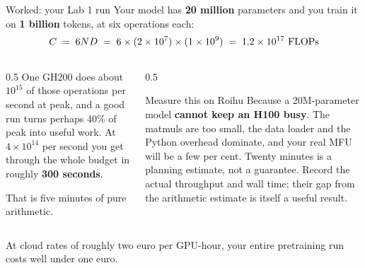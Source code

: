 \documentclass[aspectratio=169,10pt]{beamer}
\begin{document}
\begin{frame}[shrink=9]{Worked: your Lab 1 run}
  Your model has \textbf{20 million} parameters and you train it on
  \textbf{1 billion} tokens, at six operations each:
  \[
    C \;=\; 6ND \;=\; 6 \times (2\times10^{7}) \times (1\times10^{9})
      \;=\; 1.2\times10^{17}\ \mathrm{FLOPs}
  \]
  \vspace{0.2em}
  \begin{columns}[T]
    \begin{column}{0.5\textwidth}
      One GH200 does about $10^{15}$ of those operations per second at peak,
      and a good run turns perhaps 40\% of peak into useful work. At
      $4\times10^{14}$ per second you get through the whole budget in roughly
      \textbf{300 seconds}.
      \vspace{0.3em}

      That is five minutes of pure arithmetic.
    \end{column}
    \begin{column}{0.5\textwidth}
      \begin{block}{Measure this on Roihu}
        \small
        Because a 20M-parameter model \textbf{cannot keep an H100 busy}. The
        matmuls are too small, the data loader and the Python overhead
        dominate, and your real MFU will be a few per cent.
        \vspace{0.4em}
        Twenty minutes is a planning estimate, not a guarantee. Record the
        actual throughput and wall time; their gap from the arithmetic estimate
        is itself a useful result.
      \end{block}
    \end{column}
  \end{columns}
  \vspace{0.5em}
  \small
  At cloud rates of roughly two euro per GPU-hour, your entire pretraining run
  costs well under one euro.
\end{frame}
\end{document}
